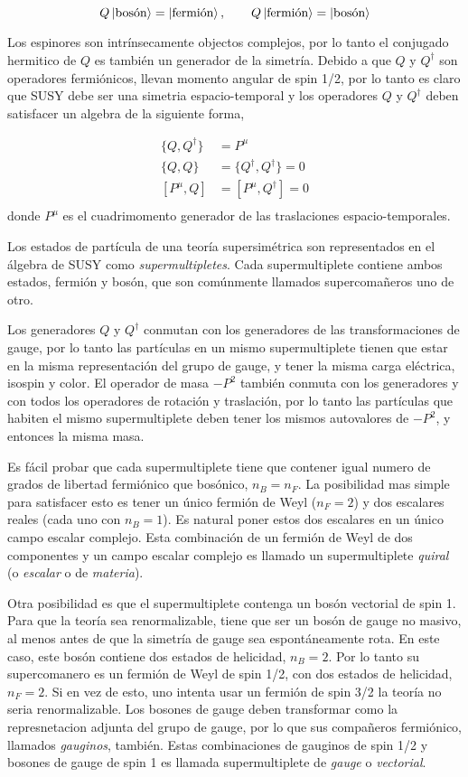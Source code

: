 \begin{equation}
  Q \left| \text{bosón} \right> = \left| \text{fermión} \right>, \quad \quad Q \left| \text{fermión} \right> = \left| \text{bosón} \right>
\end{equation}

Los espinores son intrínsecamente objectos complejos, por lo tanto el conjugado
hermitico de $Q$ es también un generador de la simetría. Debido a que $Q$ y $Q^\dagger$
son operadores fermiónicos, llevan momento angular de spin 1/2, por lo tanto es
claro que SUSY debe ser una simetria espacio-temporal y los operadores $Q$ y
$Q^\dagger$ deben satisfacer un algebra de la siguiente forma,

\begin{align}
  \{Q, Q^\dagger\} &= P^\mu \\
  \{Q, Q\} &= \{Q^\dagger, Q^\dagger\} = 0 \\
  [P^\mu, Q] &= [P^\mu, Q^\dagger] = 0 \\
\end{align}
%
donde $P^\mu$ es el cuadrimomento generador de las traslaciones espacio-temporales.

Los estados de partícula de una teoría supersimétrica son representados en
el álgebra de SUSY como \emph{supermultipletes}. Cada supermultiplete contiene
ambos estados, fermión y bosón, que son comúnmente llamados supercoma\~neros
uno de otro.

Los generadores $Q$ y $Q^\dagger$ conmutan con los generadores de las
transformaciones de gauge, por lo tanto las partículas en un mismo supermultiplete
tienen que estar en la misma representación del grupo de gauge, y tener la misma
carga eléctrica, isospin y color. El operador de masa $-P^2$ también conmuta con los
generadores y con todos los operadores de rotación y traslación, por lo tanto las
partículas que habiten el mismo supermultiplete deben tener los mismos autovalores
de $-P^2$, y entonces la misma masa.

Es fácil probar que cada supermultiplete tiene que contener igual numero de grados
de libertad fermiónico que bosónico, $n_B = n_F$.
La posibilidad mas simple para satisfacer esto es tener un único fermión de Weyl
($n_F=2$) y dos escalares reales (cada uno con $n_B=1$). Es natural poner estos
dos escalares en un único campo escalar complejo. Esta combinación de un fermión
de Weyl de dos componentes y un campo escalar complejo es llamado un supermultiplete
\emph{quiral} (o \emph{escalar} o de \emph{materia}).

Otra posibilidad es
que el supermultiplete contenga un bosón vectorial de spin 1. Para que la teoría
sea renormalizable, tiene que ser un bosón de gauge no masivo, al menos antes de
que la simetría de gauge sea espontáneamente rota. En este caso, este bosón contiene
dos estados de helicidad, $n_B=2$. Por lo tanto su supercomanero es un fermión de Weyl
de spin 1/2, con dos estados de helicidad, $n_F=2$. Si en vez de esto, uno intenta usar
un fermión de spin 3/2 la teoría no seria renormalizable. Los bosones de gauge deben
transformar como la represnetacion adjunta del grupo de gauge, por lo que sus compañeros
fermiónico, llamados \emph{gauginos}, también. Estas combinaciones de gauginos de
spin 1/2 y bosones de gauge de spin 1 es llamada supermultiplete de \emph{gauge} o
\emph{vectorial}.

